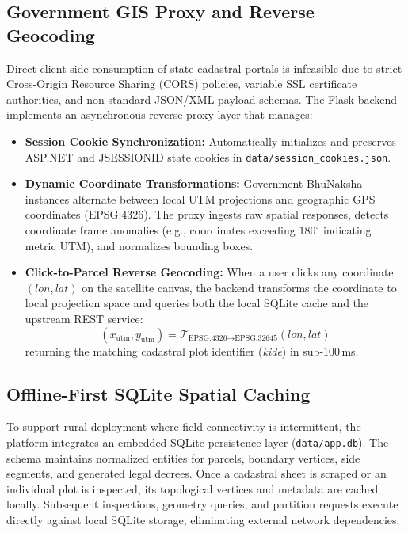 \documentclass[conference]{IEEEtran}
\begin{document}
\subsection{Government GIS Proxy and Reverse Geocoding}
Direct client-side consumption of state cadastral portals is infeasible due to strict Cross-Origin Resource Sharing (CORS) policies, variable SSL certificate authorities, and non-standard JSON/XML payload schemas. The Flask backend implements an asynchronous reverse proxy layer that manages:
\begin{itemize}
    \item \textbf{Session Cookie Synchronization:} Automatically initializes and preserves ASP.NET and JSESSIONID state cookies in \texttt{data/session\_cookies.json}.
    \item \textbf{Dynamic Coordinate Transformations:} Government BhuNaksha instances alternate between local UTM projections and geographic GPS coordinates ($\text{EPSG:4326}$). The proxy ingests raw spatial responses, detects coordinate frame anomalies (e.g., coordinates exceeding $180^\circ$ indicating metric UTM), and normalizes bounding boxes.
    \item \textbf{Click-to-Parcel Reverse Geocoding:} When a user clicks any coordinate $(lon, lat)$ on the satellite canvas, the backend transforms the coordinate to local projection space and queries both the local SQLite cache and the upstream REST service:
    \begin{equation}
        (x_{\text{utm}}, y_{\text{utm}}) = \mathcal{T}_{\text{EPSG:4326} \to \text{EPSG:32645}}(lon, lat)
    \end{equation}
    returning the matching cadastral plot identifier (\textit{kide}) in sub-100\,ms.
\end{itemize}

\subsection{Offline-First SQLite Spatial Caching}
To support rural deployment where field connectivity is intermittent, the platform integrates an embedded SQLite persistence layer (\texttt{data/app.db}). The schema maintains normalized entities for parcels, boundary vertices, side segments, and generated legal decrees. Once a cadastral sheet is scraped or an individual plot is inspected, its topological vertices and metadata are cached locally. Subsequent inspections, geometry queries, and partition requests execute directly against local SQLite storage, eliminating external network dependencies.
\end{document}
